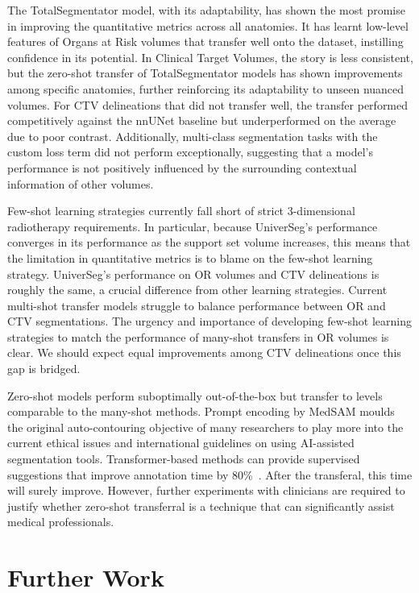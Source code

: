 \documentclass[11pt,twoside]{report}
\begin{document}
The TotalSegmentator model, with its adaptability, has shown the most promise in improving the quantitative metrics across all anatomies. It has learnt low-level features of Organs at Risk volumes that transfer well onto the dataset, instilling confidence in its potential. In Clinical Target Volumes, the story is less consistent, but the zero-shot transfer of TotalSegmentator models has shown improvements among specific anatomies, further reinforcing its adaptability to unseen nuanced volumes. For CTV delineations that did not transfer well, the transfer performed competitively against the nnUNet baseline but underperformed on the average due to poor contrast. Additionally, multi-class segmentation tasks with the custom loss term did not perform exceptionally, suggesting that a model's performance is not positively influenced by the surrounding contextual information of other volumes.

Few-shot learning strategies currently fall short of strict 3-dimensional radiotherapy requirements. In particular, because UniverSeg's performance converges in its performance as the support set volume increases, this means that the limitation in quantitative metrics is to blame on the few-shot learning strategy. UniverSeg's performance on OR volumes and CTV delineations is roughly the same, a crucial difference from other learning strategies. Current multi-shot transfer models struggle to balance performance between OR and CTV segmentations. The urgency and importance of developing few-shot learning strategies to match the performance of many-shot transfers in OR volumes is clear. We should expect equal improvements among CTV delineations once this gap is bridged.

Zero-shot models perform suboptimally out-of-the-box but transfer to levels comparable to the many-shot methods. Prompt encoding by MedSAM moulds the original auto-contouring objective of many researchers to play more into the current ethical issues and international guidelines on using AI-assisted segmentation tools. Transformer-based methods can provide supervised suggestions that improve annotation time by 80\%~\cite{Ma2024}. After the transferal, this time will surely improve. However, further experiments with clinicians are required to justify whether zero-shot transferral is a technique that can significantly assist medical professionals.

\section{Further Work}
\end{document}
